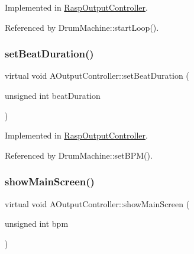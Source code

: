 Implemented in \hyperlink{class_rasp_output_controller_afce87d510c0564567e4250b22639d5e0}{Rasp\+Output\+Controller}.



Referenced by Drum\+Machine\+::start\+Loop().

\mbox{\label{class_a_output_controller_ac685432fc57d2441ecb548386554d2c9}} 
\subsubsection{\texorpdfstring{set\+Beat\+Duration()}{setBeatDuration()}}
{\footnotesize\ttfamily virtual void A\+Output\+Controller\+::set\+Beat\+Duration (\begin{DoxyParamCaption}\item[{unsigned int}]{beat\+Duration }\end{DoxyParamCaption})\hspace{0.3cm}{\ttfamily [pure virtual]}}



Implemented in \hyperlink{class_rasp_output_controller_a5fd551f1aba056356befd71e5bff23f1}{Rasp\+Output\+Controller}.



Referenced by Drum\+Machine\+::set\+B\+P\+M().

\mbox{\label{class_a_output_controller_ace7df9de71110b3615156b9bd06a9349}} 
\subsubsection{\texorpdfstring{show\+Main\+Screen()}{showMainScreen()}}
{\footnotesize\ttfamily virtual void A\+Output\+Controller\+::show\+Main\+Screen (\begin{DoxyParamCaption}\item[{unsigned int}]{bpm }\end{DoxyParamCaption})\hspace{0.3cm}{\ttfamily [pure virtual]}}



